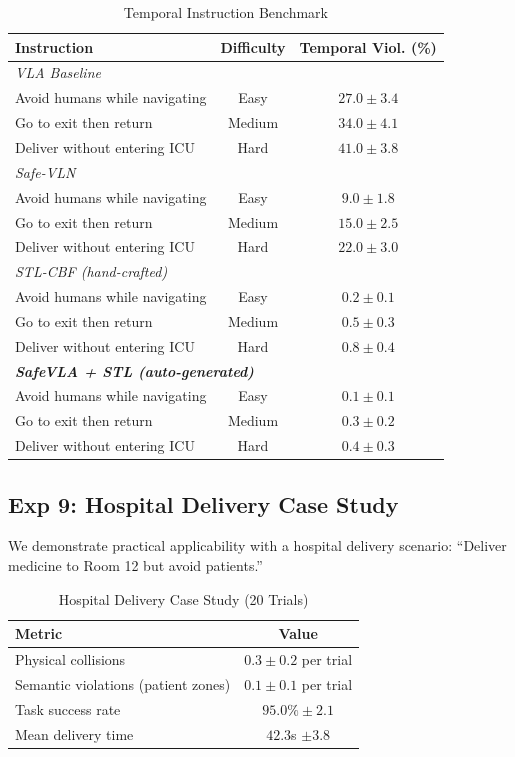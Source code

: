 \documentclass[conference]{IEEEtran}
\begin{document}
\begin{table}[h]
\centering
\caption{Temporal Instruction Benchmark}
\begin{tabular}{lcc}
\toprule
\textbf{Instruction} & \textbf{Difficulty} & \textbf{Temporal Viol. (\%)} \\
\midrule
\multicolumn{3}{l}{\textit{VLA Baseline}} \\
Avoid humans while navigating & Easy & $27.0 \pm 3.4$ \\
Go to exit then return & Medium & $34.0 \pm 4.1$ \\
Deliver without entering ICU & Hard & $41.0 \pm 3.8$ \\
\midrule
\multicolumn{3}{l}{\textit{Safe-VLN}} \\
Avoid humans while navigating & Easy & $9.0 \pm 1.8$ \\
Go to exit then return & Medium & $15.0 \pm 2.5$ \\
Deliver without entering ICU & Hard & $22.0 \pm 3.0$ \\
\midrule
\multicolumn{3}{l}{\textit{STL-CBF (hand-crafted)~\cite{lindemann2018cbf_stl}}} \\
Avoid humans while navigating & Easy & $0.2 \pm 0.1$ \\
Go to exit then return & Medium & $0.5 \pm 0.3$ \\
Deliver without entering ICU & Hard & $0.8 \pm 0.4$ \\
\midrule
\multicolumn{3}{l}{\textit{\textbf{SafeVLA + STL (auto-generated)}}} \\
Avoid humans while navigating & Easy & $\mathbf{0.1 \pm 0.1}$ \\
Go to exit then return & Medium & $\mathbf{0.3 \pm 0.2}$ \\
Deliver without entering ICU & Hard & $\mathbf{0.4 \pm 0.3}$ \\
\bottomrule
\end{tabular}
\end{table}

\subsection{Exp 9: Hospital Delivery Case Study}
We demonstrate practical applicability with a hospital delivery scenario: ``Deliver medicine to Room 12 but avoid patients.''

\begin{table}[h]
\centering
\caption{Hospital Delivery Case Study (20 Trials)}
\begin{tabular}{lc}
\toprule
\textbf{Metric} & \textbf{Value} \\
\midrule
Physical collisions & $0.3 \pm 0.2$ per trial \\
Semantic violations (patient zones) & $0.1 \pm 0.1$ per trial \\
Task success rate & $95.0\% \pm 2.1$ \\
Mean delivery time & $42.3$s $\pm 3.8$ \\
\bottomrule
\end{tabular}
\end{table}
\end{document}
